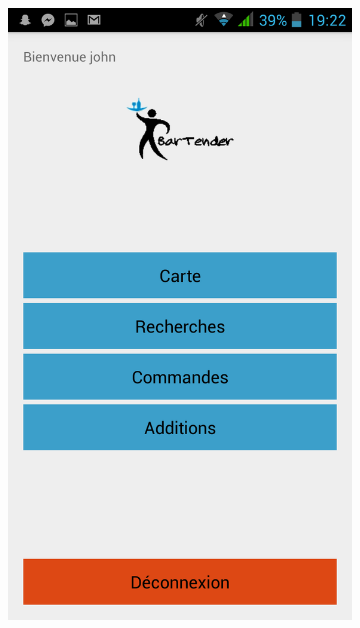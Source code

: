 \begin{figure}[H]
    \centering
    \begin{subfigure}
        \centering
        \includegraphics[scale=0.15]{img/waiter-logged.png}
    \end{subfigure}%
    ~ 
    \begin{subfigure}
        \centering

\end{subfigure}
\end{figure}
